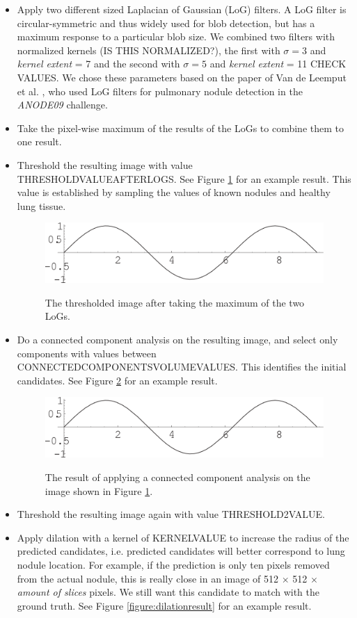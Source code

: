 \documentclass{article}
\begin{document}
\begin{itemize}
\item Apply two different sized Laplacian of Gaussian (LoG) filters. A LoG filter is circular-symmetric and thus widely used for blob detection, but has a maximum response to a particular blob size. We combined two filters with normalized kernels (IS THIS NORMALIZED?), the first with $\sigma = 3$ and \emph{kernel extent} = 7 and the second with $\sigma = 5$ and \emph{kernel extent} = 11 CHECK VALUES. We chose these parameters based on the paper of Van de Leemput et al. \cite{leemput}, who used LoG filters for pulmonary nodule detection in the \emph{ANODE09} challenge.
\item Take the pixel-wise maximum of the results of the LoGs to combine them to one result.
\item Threshold the resulting image with value THRESHOLDVALUEAFTERLOGS. See Figure \ref{figure:LoGresult} for an example result. This value is established by sampling the values of known nodules and healthy lung tissue.
	\begin{figure}[h]
	\centering
	{\includegraphics[width=0.7\linewidth]{./figure.png}}
	\caption{The thresholded image after taking the maximum of the two LoGs. \label{figure:LoGresult}}
	\end{figure}
\item Do a connected component analysis on the resulting image, and select only components with values between CONNECTEDCOMPONENTSVOLUMEVALUES. This identifies the initial candidates. See Figure \ref{figure:conncomp} for an example result.
	\begin{figure}[h]
	\centering
	{\includegraphics[width=0.7\linewidth]{./figure.png}}
	\caption{The result of applying a connected component analysis on the image shown in Figure \ref{figure:LoGresult}. \label{figure:conncomp}}
	\end{figure}
\item Threshold the resulting image again with value THRESHOLD2VALUE.
\item Apply dilation with a kernel of KERNELVALUE to increase the radius of the predicted candidates, i.e. predicted candidates will better correspond to lung nodule location. For example, if the prediction is only ten pixels removed from the actual nodule, this is really close in an image of 512 $\times$ 512 $\times$ \textit{ amount of slices} pixels. We still want this candidate to match with the ground truth.  See Figure \ref{figure:dilationresult} for an example result.

\end{itemize}
\end{document}
